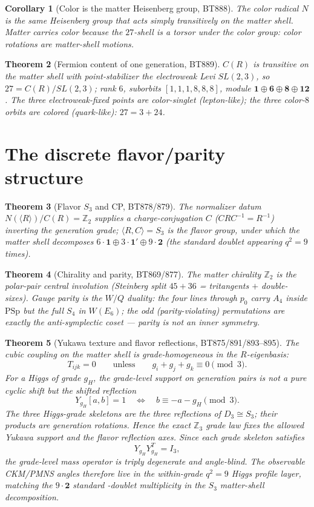 \documentclass[11pt]{article}
\newtheorem{theorem}{Theorem}
\newtheorem{corollary}[theorem]{Corollary}
\newcommand{\PSp}{\mathrm{PSp}}
\newcommand{\Z}{\mathbb{Z}}
\begin{document}
\begin{corollary}[Color is the matter Heisenberg group, BT888]
The color radical $N$ is the \emph{same} Heisenberg group that acts
simply transitively on the matter shell. Matter carries color because
the $27$-shell is a torsor under the color group: color rotations are
matter-shell motions.
\end{corollary}

\begin{theorem}[Fermion content of one generation, BT889]
$C(R)$ is transitive on the matter shell with point-stabilizer the
electroweak Levi $SL(2,3)$, so $27=C(R)/SL(2,3)$; rank $6$, suborbits
$[1,1,1,8,8,8]$, module $\mathbf 1\oplus\mathbf 6\oplus\mathbf 8\oplus
\mathbf{12}$. The three electroweak-fixed points are color-singlet
(lepton-like); the three color-$8$ orbits are colored (quark-like):
$27=3+24$.
\end{theorem}

\section{The discrete flavor/parity structure}
\begin{theorem}[Flavor $S_3$ and CP, BT878/879]
The normalizer datum $N(\langle R\rangle)/C(R)=\Z_2$ supplies a
charge-conjugation $C$ ($CRC^{-1}=R^{-1}$) inverting the generation
grade; $\langle R,C\rangle=S_3$ is the flavor group, under which the
matter shell decomposes $6\cdot\mathbf 1\oplus3\cdot\mathbf{1'}\oplus
9\cdot\mathbf 2$ (the standard doublet appearing $q^2=9$ times).
\end{theorem}

\begin{theorem}[Chirality and parity, BT869/877]
The matter chirality $\Z_2$ is the polar-pair central involution
(Steinberg split $45+36$ = tritangents $+$ double-sixes). Gauge parity
is the $W/Q$ duality: the four lines through $p_0$ carry $A_4$ inside
$\PSp$ but the full $S_4$ in $W(E_6)$; the odd (parity-violating)
permutations are exactly the anti-symplectic coset --- parity is not an
inner symmetry.
\end{theorem}

\begin{theorem}[Yukawa texture and flavor reflections, BT875/891/893--895]
The cubic coupling on the matter shell is grade-homogeneous in the
$R$-eigenbasis:
\[
T_{ijk}=0\qquad\text{unless}\qquad g_i+g_j+g_k\equiv0\pmod 3.
\]
For a Higgs of grade $g_H$, the grade-level support on generation pairs is
not a pure cyclic shift but the shifted reflection
\[
Y_{g_H}[a,b]=1
\quad\Longleftrightarrow\quad
b\equiv -a-g_H\pmod 3.
\]
The three Higgs-grade skeletons are the three reflections of
$D_3\cong S_3$; their products are generation rotations. Hence the exact
$\Z_3$ grade law fixes the allowed Yukawa support and the flavor
reflection axes. Since each grade skeleton satisfies
\[
Y_{g_H}Y_{g_H}^{T}=I_3,
\]
the grade-level mass operator is triply degenerate and angle-blind. The
observable CKM/PMNS angles therefore live in the within-grade
$q^2=9$ Higgs profile layer, matching the $9\cdot\mathbf 2$ standard
-doublet multiplicity in the $S_3$ matter-shell decomposition.
\end{theorem}
\end{document}
